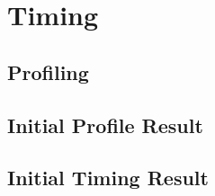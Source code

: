 \section{Timing}\label{sec:timing}
\subsection{Profiling}


\subsection{Initial Profile Result}


\subsection{Initial Timing Result}
